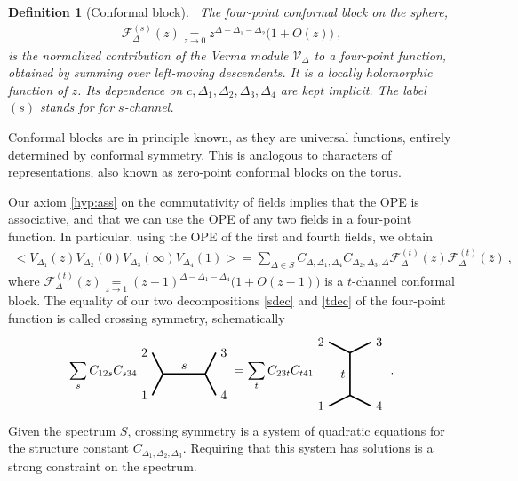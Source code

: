 \documentclass[12pt, a4paper]{article}
\theoremstyle{break}
\newtheorem{defn}[exo]{Definition}
\begin{document}
\begin{defn}[Conformal block]
 ~\label{def:block}
 The four-point conformal block on the sphere,
 \begin{align}
  \mathcal{F}^{(s)}_\Delta(z) \underset{z\to 0}{=} z^{\Delta-\Delta_1-\Delta_2}\Big( 1 + O(z) \Big)\ ,
  \label{eq:gsd}
 \end{align}
is the normalized contribution of the Verma module $\mathcal V_\Delta$ to a four-point function, obtained by summing over left-moving descendents. It is a locally holomorphic function of $z$. Its dependence on $c,\Delta_1,\Delta_2,\Delta_3,\Delta_4$ are kept implicit. The label $(s)$ stands for for $s$-channel.
\end{defn}
Conformal blocks are in principle known, as they are universal functions, entirely determined by conformal symmetry. This is analogous to characters of representations, also known as zero-point conformal blocks on the torus.

Our axiom \ref{hyp:ass} on the commutativity of fields implies that the OPE is associative, and that we can use the OPE of any two fields in a four-point function. In particular, using the OPE of the first and fourth fields, we obtain 
\begin{align}
 \Big<V_{\Delta_1}(z)V_{\Delta_2}(0)V_{\Delta_3}(\infty)V_{\Delta_4}(1)\Big>
 =\sum_{\Delta\in S} C_{\Delta,\Delta_1,\Delta_4} C_{\Delta_2,\Delta_3,\Delta}   \mathcal{F}^{(t)}_\Delta(z) \mathcal{F}^{(t)}_\Delta(\bar z)\ ,
 \label{tdec}
\end{align}
where $\mathcal{F}^{(t)}_\Delta(z) \underset{z\to 1}{=} (z-1)^{\Delta-\Delta_1-\Delta_4}\Big(1+O(z-1)\Big)$ is a $t$-channel conformal block.
The equality of our two decompositions \eqref{sdec} and \eqref{tdec} of the four-point function is called crossing symmetry, schematically 
\begin{align}
 \sum_{s} C_{12s} C_{s34} 
 \begin{tikzpicture}[baseline=(current  bounding  box.center), very thick, scale = .3]
\draw (-1,2) node [left] {$2$} -- (0,0) -- node [above] {$s$} (4,0) -- (5,2) node [right] {$3$};
\draw (-1,-2) node [left] {$1$} -- (0,0);
\draw (4,0) -- (5,-2) node [right] {$4$};
\end{tikzpicture} 
= \sum_{t} C_{23t}C_{t41} 
\begin{tikzpicture}[baseline=(current  bounding  box.center), very thick, scale = .3]
 \draw (-2,3) node [left] {$2$} -- (0,2) -- node [left] {$t$} (0,-2) -- (-2, -3) node [left] {$1$};
\draw (0,2) -- (2,3) node [right] {$3$};
\draw (0,-2) -- (2, -3) node [right] {$4$};
\end{tikzpicture}
\ .
\label{csd}
\end{align}
Given the spectrum $S$, crossing symmetry is a system of quadratic equations for the structure constant $C_{\Delta_1,\Delta_2,\Delta_3}$. Requiring that this system has solutions is a strong constraint on the spectrum. 
\end{document}

